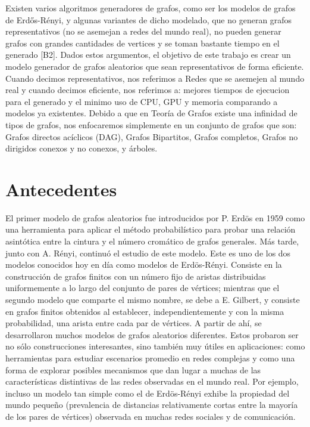 \documentclass[11pt]{extarticle}
\begin{document}
Existen varios algoritmos generadores de grafos, como ser los modelos de grafos de Erdős-Rényi,
y algunas variantes de dicho modelado, que no generan grafos representativos (no se asemejan a redes del mundo real), no pueden generar grafos con grandes 
cantidades de vertices y se toman bastante tiempo en 
el generado [B2]. 
Dados estos argumentos,  el objetivo de este trabajo es crear un modelo generador de grafos aleatorios que sean representativos de 
forma eficiente. Cuando decimos representativos, nos referimos a Redes que se asemejen al mundo real y cuando decimos eficiente, nos referimos a: mejores tiempos de ejecucion para
el generado y el minimo uso de CPU, GPU y memoria comparando a modelos ya existentes. \hfill \break \break
Debido a que en Teoría de Grafos existe una infinidad de tipos de grafos, nos enfocaremos simplemente en un conjunto 
de grafos que son: Grafos directos acíclicos (DAG), Grafos Bipartitos, Grafos completos, 
Grafos no dirigidos conexos y no conexos, y árboles.

\section{Antecedentes}
El primer modelo de grafos aleatorios fue introducidos por P. Erdös en 1959 como una
herramienta para aplicar el método probabilístico para probar una relación asintótica entre
la cintura y el número cromático de grafos generales. Más tarde, junto con A. Rényi,
continuó el estudio de este modelo. Este es uno de los dos modelos conocidos
hoy en día como modelos de Erdös-Rényi. Consiste en la construcción de grafos finitos con un
número fijo de aristas distribuidas uniformemente a lo largo del conjunto de pares de vértices;
mientras que el segundo modelo que comparte el mismo nombre, se debe a E. Gilbert, y
consiste en grafos finitos obtenidos al establecer, independientemente y con la misma probabilidad, una arista entre cada par de vértices. A partir de ahí, se desarrollaron muchos modelos
de grafos aleatorios diferentes. Estos probaron ser no sólo construcciones interesantes, sino
también muy útiles en aplicaciones: como herramientas para estudiar escenarios promedio en
redes complejas y como una forma de explorar posibles mecanismos que dan lugar a muchas
de las características distintivas de las redes observadas en el mundo real. Por ejemplo, incluso
un modelo tan simple como el de Erdös-Rényi exhibe la propiedad del mundo pequeño (prevalencia de distancias relativamente cortas entre la mayoría de los pares de vértices) observada
en muchas redes sociales y de comunicación.
\end{document}
